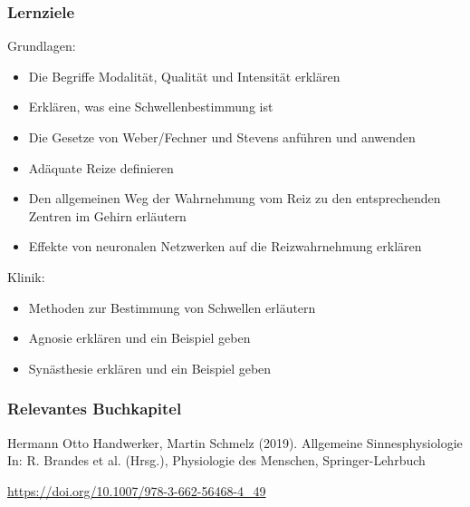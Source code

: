 \documentclass[aspectratio=169]{beamer}
\begin{document}



\begin{frame}

 \frametitle{Lernziele}



\begin{block}{Grundlagen:}




\begin{itemize}

    \item 
Die Begriffe Modalität, Qualität und Intensität erklären
    \item 
Erklären, was eine Schwellenbestimmung ist 
    \item 
Die Gesetze von Weber/Fechner und Stevens anführen und anwenden
    \item 
Adäquate Reize definieren
    \item 
Den allgemeinen Weg der Wahrnehmung vom Reiz zu den entsprechenden Zentren im Gehirn erläutern 
    \item 
Effekte von neuronalen Netzwerken auf die Reizwahrnehmung erklären
\end{itemize}


\end{block}



 

\begin{block}{Klinik:}

\begin{itemize}
    
\item 
Methoden zur Bestimmung von Schwellen erläutern 
\item
Agnosie erklären und ein Beispiel geben
\item
Synästhesie erklären und ein Beispiel geben


\end{itemize}


\end{block}

\end{frame}

\begin{frame}

 \frametitle{Relevantes Buchkapitel}


Hermann Otto Handwerker, Martin Schmelz (2019). Allgemeine Sinnesphysiologie In: R. Brandes et al. (Hrsg.), Physiologie des Menschen, Springer-Lehrbuch

\url{https://doi.org/10.1007/978-3-662-56468-4_49}



\end{frame}
\end{document}
